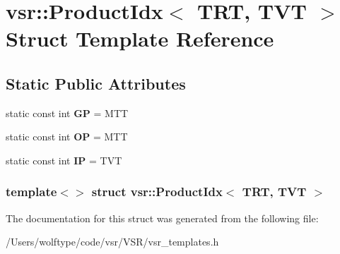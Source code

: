\hypertarget{structvsr_1_1_product_idx_3_01_t_r_t_00_01_t_v_t_01_4}{\section{vsr\-:\-:Product\-Idx$<$ T\-R\-T, T\-V\-T $>$ Struct Template Reference}
\label{structvsr_1_1_product_idx_3_01_t_r_t_00_01_t_v_t_01_4}
}
\subsection*{Static Public Attributes}
\begin{DoxyCompactItemize}
\item 
\hypertarget{structvsr_1_1_product_idx_3_01_t_r_t_00_01_t_v_t_01_4_a7915e24073f383f9cb596dd0696d0511}{static const int {\bfseries G\-P} = M\-T\-T}\label{structvsr_1_1_product_idx_3_01_t_r_t_00_01_t_v_t_01_4_a7915e24073f383f9cb596dd0696d0511}

\item 
\hypertarget{structvsr_1_1_product_idx_3_01_t_r_t_00_01_t_v_t_01_4_ab68ef64b9bd78610e18d14651a7afcb4}{static const int {\bfseries O\-P} = M\-T\-T}\label{structvsr_1_1_product_idx_3_01_t_r_t_00_01_t_v_t_01_4_ab68ef64b9bd78610e18d14651a7afcb4}

\item 
\hypertarget{structvsr_1_1_product_idx_3_01_t_r_t_00_01_t_v_t_01_4_acc5e4c5e17ef755b260df6e5f99c721a}{static const int {\bfseries I\-P} = T\-V\-T}\label{structvsr_1_1_product_idx_3_01_t_r_t_00_01_t_v_t_01_4_acc5e4c5e17ef755b260df6e5f99c721a}

\end{DoxyCompactItemize}
\subsubsection*{template$<$$>$ struct vsr\-::\-Product\-Idx$<$ T\-R\-T, T\-V\-T $>$}



The documentation for this struct was generated from the following file\-:\begin{DoxyCompactItemize}
\item 
/\-Users/wolftype/code/vsr/\-V\-S\-R/vsr\-\_\-templates.\-h\end{DoxyCompactItemize}
